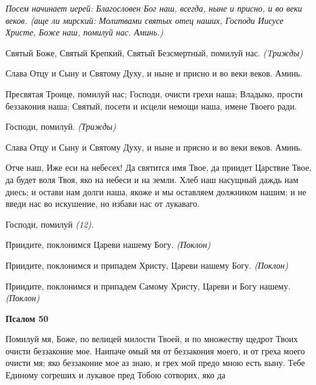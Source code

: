  \itshape Посем начинает иерей:\normalfont{} Благословен Бог наш, всегда, ныне и присно, и во
веки веков. (\itshape аще ли мирский:\normalfont{} Молитвами святых отец наших, Господи
Иисусе Христе, Боже наш, помилуй нас. Аминь.)



   Святый Боже, Святый Крепкий, Святый Безсмертный, помилуй нас. \itshape 
(Tрижды)\normalfont{}



   Слава Отцу и Сыну и Святому Духу, и ныне и присно и во веки веков.
Аминь.



   Пресвятая Троице, помилуй нас; Господи, очисти грехи наша; Владыко,
прости беззакония наша; Святый, посети и исцели немощи наша, имене
Твоего ради.



   Господи, помилуй. \itshape  (Трижды)\normalfont{}



   Слава Отцу и Сыну и Святому Духу, и ныне и присно и во веки веков.
Аминь.



   Отче наш, Иже еси на небесех! Да святится имя Твое, да приидет
Царствие Твое, да будет воля Твоя, яко на небеси и на земли. Хлеб наш
насущный даждь нам днесь; и остави нам долги наша, якоже и мы оставляем
должником нашим; и не введи нас во искушение, но избави нас от
лукаваго.



   Господи, помилуй \itshape (12)\normalfont{}.



   Приидите, поклонимся Цареви нашему Богу. \itshape (Поклон)\normalfont{}



   Приидите, поклонимся и припадем Христу, Цареви нашему Богу.
\itshape (Поклон)\normalfont{}



   Приидите, поклонимся и припадем Самому Христу, Цареви и Богу
нашему. \itshape (Поклон)\normalfont{}



 

\bfseries Псалом 50\normalfont{}


   Помилуй мя, Боже, по велицей милости Твоей, и по множеству щедрот
Твоих очисти беззаконие мое. Наипаче омый мя от беззакония моего, и от
греха моего очисти мя; яко беззаконие мое аз знаю, и грех мой предо мною
есть выну. Тебе Единому согреших и лукавое пред Тобою сотворих, яко да


